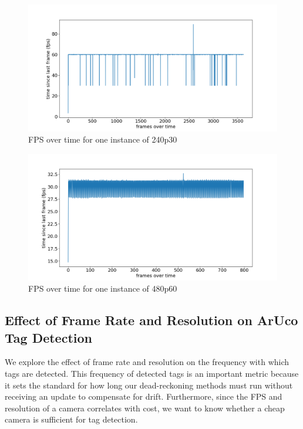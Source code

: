 \documentclass{article}
\begin{document}
    \begin{figure}[H]
      \centering
      \includegraphics[width=0.8\linewidth]{./images/fps_plot_2.png}
      \caption{FPS over time for one instance of 240p30}
      \label{fig:fps_plot_2}
    \end{figure}

    \begin{figure}[H]
      \centering
      \includegraphics[width=0.8\linewidth]{./images/fps_plot_1.png}
      \caption{FPS over time for one instance of  480p60}
      \label{fig:fps_plot_1}
    \end{figure}

	\subsection{Effect of Frame Rate and Resolution on ArUco Tag Detection}

    We explore the effect of frame rate and resolution on the frequency with which tags are detected. This frequency of detected tags is an important metric because it sets the standard for how long our dead-reckoning methods must run without receiving an update to compensate for drift. Furthermore, since the FPS and resolution of a camera correlates with cost, we want to know whether a cheap camera is sufficient for tag detection.
\end{document}
